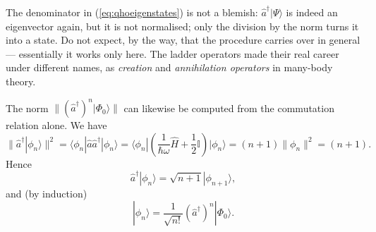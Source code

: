 The denominator in (\ref{eq:qhoeigenstates}) is not a blemish: $\widehat{a}^\dag|\Psi\rangle$ is indeed an eigenvector again, but it is not normalised; only the division by the norm turns it into a state. Do not expect, by the way, that the procedure carries over in general --- essentially it works only here. The ladder operators made their real career under different names, as \emph{creation} and \emph{annihilation operators} in many-body theory.

The norm $\|(\widehat{a}^\dag)^n|\Phi_0\rangle\|$ can likewise be computed from the commutation relation
alone. We have
\begin{equation}
	\|\widehat{a}^\dag|\phi_n\rangle\|^2 = \langle\phi_n|\widehat{a}\widehat{a}^\dag|\phi_n\rangle =  \langle\phi_n|\left(\frac{1}{\hbar\omega}\widehat{H}+\frac12\mathbb{I}\right)|\phi_n\rangle=(n+1)\|\phi_n\|^2 = (n+1).
\end{equation}
Hence 
\begin{equation}
	\widehat{a}^\dag|\phi_n\rangle = \sqrt{n+1}|\phi_{n+1}\rangle,
\end{equation}
and (by induction)
\begin{equation}
	|\phi_n\rangle = \frac{1}{\sqrt{n!}}(\widehat{a}^\dag)^n|\Phi_0\rangle.
\end{equation}

